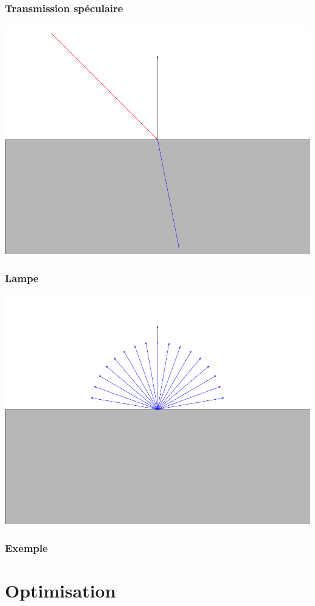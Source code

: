 \documentclass[handout]{beamer}
\begin{document}
\begin{frame}
    \frametitle{Transmission spéculaire}
    \includegraphics[scale=0.3]{Dielectrique.png}
\end{frame}

\begin{frame}
    \frametitle{Lampe}
    \includegraphics[scale=0.3]{Lampe.png}
\end{frame}

\begin{frame}
    \frametitle{Exemple}
    
\end{frame}

\section{Optimisation}
\end{document}
